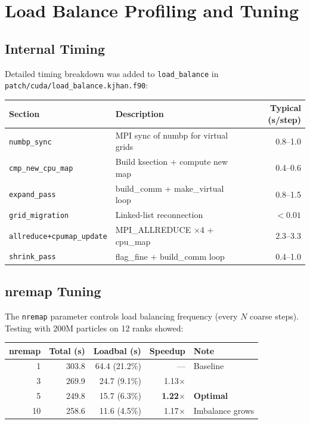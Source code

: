 \documentclass[11pt,fleqn]{book}
\begin{document}
\chapter{Load Balance Profiling and Tuning}

\section{Internal Timing}

Detailed timing breakdown was added to \texttt{load\_balance} in \texttt{patch/cuda/load\_balance.kjhan.f90}:

\begin{center}
\begin{tabular}{llr}
\toprule
\textbf{Section} & \textbf{Description} & \textbf{Typical (s/step)} \\
\midrule
\texttt{numbp\_sync} & MPI sync of numbp for virtual grids & 0.8--1.0 \\
\texttt{cmp\_new\_cpu\_map} & Build ksection + compute new map & 0.4--0.6 \\
\texttt{expand\_pass} & build\_comm + make\_virtual loop & 0.8--1.5 \\
\texttt{grid\_migration} & Linked-list reconnection & $< 0.01$ \\
\texttt{allreduce+cpumap\_update} & MPI\_ALLREDUCE $\times$4 + cpu\_map & 2.3--3.3 \\
\texttt{shrink\_pass} & flag\_fine + build\_comm loop & 0.4--1.0 \\
\bottomrule
\end{tabular}
\end{center}

\section{nremap Tuning}

The \texttt{nremap} parameter controls load balancing frequency (every $N$ coarse steps). Testing with 200M particles on 12 ranks showed:

\begin{center}
\begin{tabular}{rrrrl}
\toprule
\textbf{nremap} & \textbf{Total (s)} & \textbf{Loadbal (s)} & \textbf{Speedup} & \textbf{Note} \\
\midrule
1 & 303.8 & 64.4 (21.2\%) & --- & Baseline \\
3 & 269.9 & 24.7 (9.1\%) & 1.13$\times$ & \\
5 & 249.8 & 15.7 (6.3\%) & \textbf{1.22$\times$} & \textbf{Optimal} \\
10 & 258.6 & 11.6 (4.5\%) & 1.17$\times$ & Imbalance grows \\
\bottomrule
\end{tabular}
\end{center}
\end{document}
